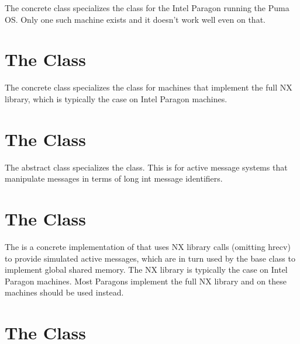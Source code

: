 The  concrete class specializes the
 class for the Intel Paragon running the Puma
OS.  Only one such machine exists and it doesn't work well even on that.


\section{The  Class}
\label{ParagonMemoryGrp}

The  concrete class specializes the
 class for machines that implement the full NX
library, which is typically the case on Intel Paragon machines.


\section{The  Class}
\label{MIDMemoryGrp}

The  abstract class specializes the
 class.  This is for active message systems
that manipulate messages in terms of long int message identifiers.


\section{The  Class}
\label{IParagonMemoryGrp}

The  is a concrete implementation of
 that uses NX library calls (omitting hrecv) to
provide simulated active messages, which are in turn used by the
 base class to implement global shared memory.
The NX library is typically the case on Intel Paragon machines.  Most
Paragons implement the full NX library and on these machines
 should be used instead.


\section{The  Class}
\label{MPIMemoryGrp}

